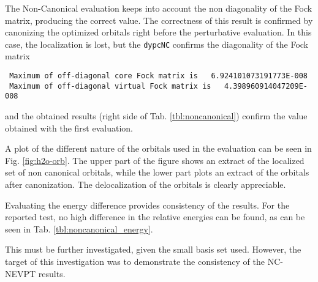 The Non-Canonical evaluation keeps into account the non
diagonality of the Fock matrix, producing the correct value.
The correctness of this result is confirmed by canonizing the optimized
orbitals right before the perturbative evaluation. In this case, the
localization is lost, but the \texttt{dypcNC} confirms the diagonality of
the Fock matrix

{
\footnotesize
\begin{verbatim}
 Maximum of off-diagonal core Fock matrix is   6.924101073191773E-008
 Maximum of off-diagonal virtual Fock matrix is   4.398960914047209E-008
\end{verbatim}
}
and the obtained results (right side of Tab. \ref{tbl:noncanonical})
confirm the value obtained with the first evaluation.

A plot of the different nature of the orbitals used in the evaluation can be
seen in Fig. \ref{fig:h2o-orb}. The upper part of the figure shows an
extract of the localized set of non canonical orbitals, while the lower part plots
an extract of the orbitals after canonization. The delocalization of the
orbitals is clearly appreciable. 



Evaluating the energy difference provides consistency of the results.  For
the reported test, no high difference in the relative energies can be found,
as can be seen in Tab. \ref{tbl:noncanonical_energy}.



This must be further investigated, given the small basis set used. However,
the target of this investigation was to demonstrate the consistency of the
NC-NEVPT results.

